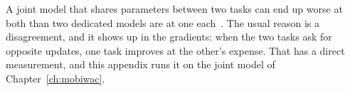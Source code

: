 A joint model that shares parameters between two tasks can end up worse at both than two dedicated
models are at one each~\cite{standley2020tasks}.
The usual reason is a disagreement, and it shows up in the gradients: when the
two tasks ask for opposite updates, one task improves at the other's expense. That has a direct measurement, and this appendix runs it on the joint model of
Chapter~\ref{ch:mobiwac}.

